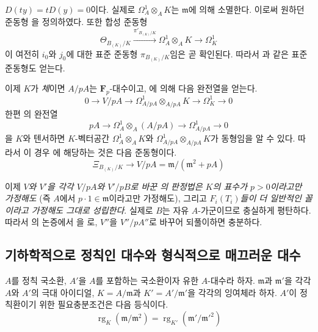 \begin{remark}[22.4.8]

$D(ty)=tD(y)=0$이다. 실제로 $\Omega^1_A\otimes_AK$는
$\mathfrak m$에 의해 소멸한다. 이로써 원하던 준동형
을 정의하였다. 또한 합성 준동형
\[
  \Theta_{B_{(K)}/K}\xrightarrow{\pi'_{B_{(K)}/K}}
  \Omega^1_A\otimes_AK\longrightarrow\Omega^1_K
\]
이 여전히 $i_0$와 $j_0$에 대한 표준 준동형
$\pi_{B_{(K)}/K}$임은 곧 확인된다. 따라서
과 같은 표준 준동형도 얻는다.

이제 $K$가 \emph{체}이면 $A/pA$는 $\mathbf F_p$-대수이고,
에 의해 다음 완전열을 얻는다.
\[
  0\longrightarrow V/pA\longrightarrow
  \Omega^1_{A/pA}\otimes_{A/pA}K\longrightarrow\Omega^1_K\longrightarrow0
\]
한편 의 완전열
\[
  pA\longrightarrow\Omega^1_A\otimes_A(A/pA)
  \longrightarrow\Omega^1_{A/pA}\longrightarrow0
\]
을 $K$와 텐서하면 $K$-벡터공간
$\Omega^1_A\otimes_AK$와
$\Omega^1_{A/pA}\otimes_{A/pA}K$가 동형임을 알 수 있다. 따라서 이
경우 에 해당하는 것은 다음 준동형이다.
\begin{equation}
\label{0.22.4.8.4-ko}
  \Xi_{B_{(K)}/K}\longrightarrow V/pA=\mathfrak m/(\mathfrak m^2+pA)
  \tag{22.4.8.4}
\end{equation}

이제 \emph{$V$와 $V'$을 각각 $V/pA$와 $V'/pB$로 바꾼
의 판정법은 $K$의 표수가 $p>0$이라고만 가정해도}
(즉 $A$에서 $p\cdot1\in\mathfrak m$이라고만 가정해도), 그리고
\emph{$F_i(T_i)$들이 더 일반적인 꼴 이라고
가정해도 그대로 성립한다}. 실제로 $B$는 자유 $A$-가군이므로
충실하게 평탄하다. 따라서 의 논증에서
을 로, $V''$을
$V''/pA''$로 바꾸어 되풀이하면 충분하다.
\end{remark}

\subsection{기하학적으로 정칙인 대수와 형식적으로 매끄러운 대수}
\label{subsection:0.22.5-ko}

\begin{proposition}[22.5.1]
\label{0.22.5.1-ko}
$A$를 정칙 국소환, $A'$을 $A$를 포함하는 국소환이자 유한
$A$-대수라 하자. $\mathfrak m$과 $\mathfrak m'$을 각각 $A$와 $A'$의
극대 아이디얼, $K=A/\mathfrak m$과 $K'=A'/\mathfrak m'$을 각각의
잉여체라 하자. $A'$이 정칙환이기 위한 필요충분조건은 다음 등식이다.
\begin{equation}
\label{0.22.5.1.1-ko}
  \operatorname{rg}_K(\mathfrak m/\mathfrak m^2)
  =\operatorname{rg}_{K'}(\mathfrak m'/\mathfrak m'^2)
  \tag{22.5.1.1}
\end{equation}
\end{proposition}

